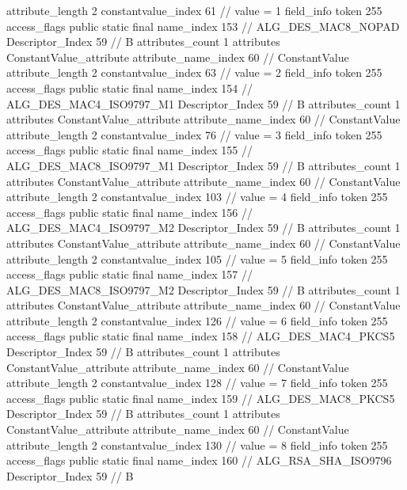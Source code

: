 {{{{{{{					attribute_length	2
					constantvalue_index	61		// value = 1
				}
				}
			}
			field_info {
				token	255
				access_flags	public static final
				name_index	153		// ALG_DES_MAC8_NOPAD
				Descriptor_Index	59		// B
				attributes_count	1
				attributes {
				ConstantValue_attribute {
					attribute_name_index	60		// ConstantValue
					attribute_length	2
					constantvalue_index	63		// value = 2
				}
				}
			}
			field_info {
				token	255
				access_flags	public static final
				name_index	154		// ALG_DES_MAC4_ISO9797_M1
				Descriptor_Index	59		// B
				attributes_count	1
				attributes {
				ConstantValue_attribute {
					attribute_name_index	60		// ConstantValue
					attribute_length	2
					constantvalue_index	76		// value = 3
				}
				}
			}
			field_info {
				token	255
				access_flags	public static final
				name_index	155		// ALG_DES_MAC8_ISO9797_M1
				Descriptor_Index	59		// B
				attributes_count	1
				attributes {
				ConstantValue_attribute {
					attribute_name_index	60		// ConstantValue
					attribute_length	2
					constantvalue_index	103		// value = 4
				}
				}
			}
			field_info {
				token	255
				access_flags	public static final
				name_index	156		// ALG_DES_MAC4_ISO9797_M2
				Descriptor_Index	59		// B
				attributes_count	1
				attributes {
				ConstantValue_attribute {
					attribute_name_index	60		// ConstantValue
					attribute_length	2
					constantvalue_index	105		// value = 5
				}
				}
			}
			field_info {
				token	255
				access_flags	public static final
				name_index	157		// ALG_DES_MAC8_ISO9797_M2
				Descriptor_Index	59		// B
				attributes_count	1
				attributes {
				ConstantValue_attribute {
					attribute_name_index	60		// ConstantValue
					attribute_length	2
					constantvalue_index	126		// value = 6
				}
				}
			}
			field_info {
				token	255
				access_flags	public static final
				name_index	158		// ALG_DES_MAC4_PKCS5
				Descriptor_Index	59		// B
				attributes_count	1
				attributes {
				ConstantValue_attribute {
					attribute_name_index	60		// ConstantValue
					attribute_length	2
					constantvalue_index	128		// value = 7
				}
				}
			}
			field_info {
				token	255
				access_flags	public static final
				name_index	159		// ALG_DES_MAC8_PKCS5
				Descriptor_Index	59		// B
				attributes_count	1
				attributes {
				ConstantValue_attribute {
					attribute_name_index	60		// ConstantValue
					attribute_length	2
					constantvalue_index	130		// value = 8
				}
				}
			}
			field_info {
				token	255
				access_flags	public static final
				name_index	160		// ALG_RSA_SHA_ISO9796
				Descriptor_Index	59		// B
}}}}}
